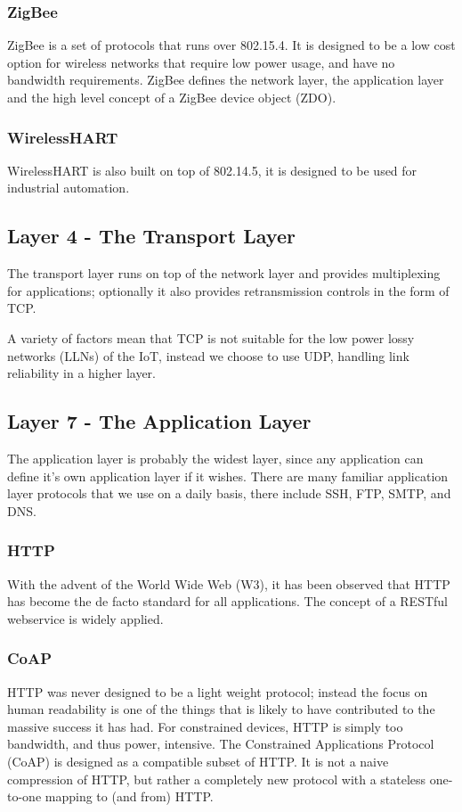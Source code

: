 \documentclass[journal]{IEEEtran}
\begin{document}
\subsubsection{ZigBee}
ZigBee is a set of protocols that runs over 802.15.4. It is designed to be a
low cost option for wireless networks that require low power usage, and have no
bandwidth requirements. ZigBee defines the network layer, the application layer
and the high level concept of a ZigBee device object (ZDO). 

\subsubsection{WirelessHART}
WirelessHART is also built on top of 802.14.5, it is designed to be used for
industrial automation. 

\subsection{Layer 4 - The Transport Layer}
The transport layer runs on top of the network layer and provides multiplexing
for applications; optionally it also provides retransmission controls in
the form of TCP. 

A variety of factors mean that TCP is not suitable for the low power lossy
networks (LLNs) of the IoT, instead we choose to use UDP, handling link
reliability in a higher layer.

\subsection{Layer 7 - The Application Layer}
The application layer is probably the widest layer, since any application can
define it's own application layer if it wishes. There are many familiar
application layer protocols that we use on a daily basis, there include SSH,
FTP, SMTP, and DNS. 

\subsubsection{HTTP} 
With the advent of the World Wide Web (W3), it has been observed that HTTP has
become the de facto standard for all applications. The concept of a RESTful
webservice is widely applied.  

\subsubsection{CoAP}
HTTP was never designed to be a light weight protocol; instead the focus on
human readability is one of the things that is likely to have contributed to
the massive success it has had. For constrained devices, HTTP is simply too
bandwidth, and thus power, intensive. The Constrained Applications Protocol
(CoAP) is designed as a compatible subset of HTTP. It is not a naive
compression of HTTP, but rather a completely new protocol with a stateless
one-to-one mapping to (and from) HTTP. 
\end{document}
